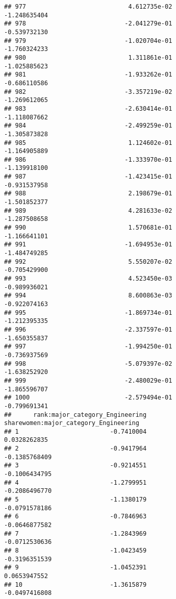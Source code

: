 \documentclass[
]{article}
\begin{document}
\begin{verbatim}
## 977                            4.612735e-02               -1.248635404
## 978                           -2.041279e-01               -0.539732130
## 979                           -1.020704e-01               -1.760324233
## 980                            1.311861e-01               -1.025885623
## 981                           -1.933262e-01               -0.686110586
## 982                           -3.357219e-02               -1.269612065
## 983                           -2.630414e-01               -1.118087662
## 984                           -2.499259e-01               -1.305873828
## 985                            1.124602e-01               -1.164905889
## 986                           -1.333970e-01               -1.139918100
## 987                           -1.423415e-01               -0.931537958
## 988                            2.198679e-01               -1.501852377
## 989                            4.281633e-02               -1.287508658
## 990                            1.570681e-01               -1.166641101
## 991                           -1.694953e-01               -1.484749285
## 992                            5.550207e-02               -0.705429900
## 993                            4.523450e-03               -0.989936021
## 994                            8.600863e-03               -0.922074163
## 995                           -1.869734e-01               -1.212395335
## 996                           -2.337597e-01               -1.650355837
## 997                           -1.994250e-01               -0.736937569
## 998                           -5.079397e-02               -1.638252920
## 999                           -2.480029e-01               -1.865596707
## 1000                          -2.579494e-01               -0.799691341
##      rank:major_category_Engineering sharewomen:major_category_Engineering
## 1                         -0.7410004                          0.0328262835
## 2                         -0.9417964                         -0.1385768409
## 3                         -0.9214551                         -0.1006434795
## 4                         -1.2799951                         -0.2086496770
## 5                         -1.1380179                         -0.0791578186
## 6                         -0.7846963                         -0.0646877582
## 7                         -1.2843969                         -0.0712530636
## 8                         -1.0423459                         -0.3196351539
## 9                         -1.0452391                          0.0653947552
## 10                        -1.3615879                         -0.0497416808

\end{verbatim}
\end{document}
